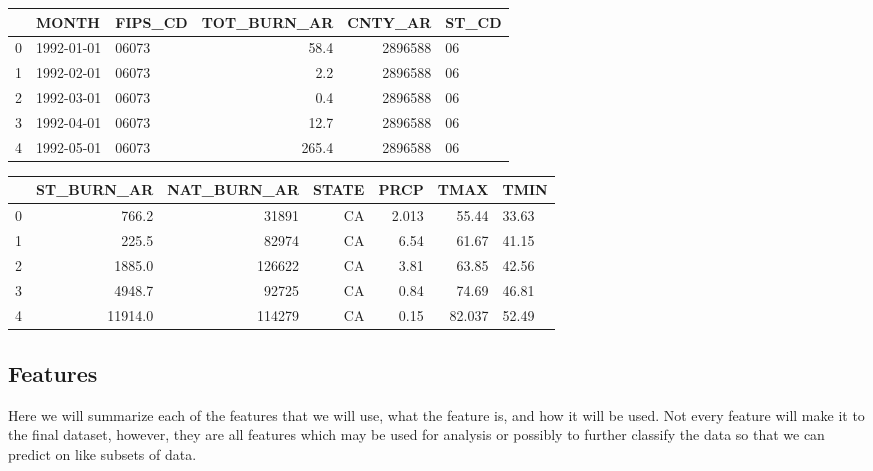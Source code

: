 \documentclass[12pt]{article}
\begin{document}
\begin{center}
\begin{tabular}{lllrrl}
\toprule 
{} & MONTH & FIPS\_CD &  TOT\_BURN\_AR &  CNTY\_AR & ST\_CD \\
\midrule
0 & 1992-01-01 &     06073 &             58.4 &    2896588 & 06 \\ 
1 & 1992-02-01 &     06073 &              2.2 &    2896588 & 06  \\
2 & 1992-03-01 &     06073 &              0.4 &    2896588 & 06 \\ 
3 & 1992-04-01 &     06073 &             12.7 &    2896588 & 06  \\
4 & 1992-05-01 &     06073 &            265.4 &    2896588 & 06 \\
\bottomrule
\end{tabular}

\begin{tabular}{lrrrrrl}
\toprule 
{} & ST\_BURN\_AR &  NAT\_BURN\_AR & STATE &      PRCP &       TMAX &       TMIN \\
\midrule
0 &  766.2 &           31891 &    CA &  2.013 &  55.44 &  33.63 \\ 
1 &  225.5 &           82974 &    CA &  6.54 &  61.67 &  41.15 \\
2 & 1885.0 &          126622 &    CA &  3.81 &  63.85 &  42.56 \\ 
3 &  4948.7 &           92725 &    CA &  0.84 &  74.69 &  46.81 \\
4 & 11914.0 &          114279 &    CA &  0.15 &  82.037 &  52.49 \\ 
\bottomrule
\end{tabular}

\end{center}

\subsection{\textrm{Features}}

Here we will summarize each of the features that we will use, what the feature is, and how it will be used. Not every feature will make it to the final dataset, however, they are all features which may be used for analysis or possibly to further classify the data so that we can predict on like subsets of data. 
\end{document}
